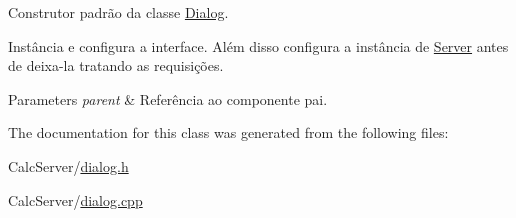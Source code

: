 Construtor padrão da classe \hyperlink{classDialog}{Dialog}. 

Instância e configura a interface. Além disso configura a instância de \hyperlink{classServer}{Server} antes de deixa-\/la tratando as requisições.


\begin{DoxyParams}{Parameters}
{\em parent} & Referência ao componente pai. \\
\hline
\end{DoxyParams}


The documentation for this class was generated from the following files\+:\begin{DoxyCompactItemize}
\item 
Calc\+Server/\hyperlink{dialog_8h}{dialog.\+h}\item 
Calc\+Server/\hyperlink{dialog_8cpp}{dialog.\+cpp}\end{DoxyCompactItemize}
